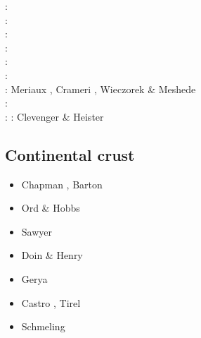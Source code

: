 \begin{scriptsize}
\twothousandtwelve: \cite{crsg12}\cite{chgv12}\cite{krwd12}\cite{may12}\cite{gerb12}\cite{asmo12}\\
\twothousandthirteen: \cite{chtl13}\cite{kemk13}\cite{gemd13}\cite{hutm13}\\
\twothousandfourteen: \cite{thmk14}\cite{mabl14}\cite{lopp14}\cite{stlh14}\\
\twothousandfifteen: \cite{lelk15}\cite{rumi15}\cite{chpe15}\cite{mabl15}\\
\twothousandsixteen: \cite{dumy16}\cite{blmp16}\\
\twothousandseventeen: \cite{robh17}\cite{wisv17}\cite{majc17}\\
\twothousandeighteen: Meriaux \etal \cite{memm18}, Crameri \cite{cram18}, Wieczorek \& Meshede \cite{wime18}\\
\twothousandnineteen: \cite{liki19}\cite{demh19}\cite{galb19}\cite{frtv19}\cite{yuwa19}\cite{ropu19}\\
\twothousandtwenty: \cite{homb20}\cite{trlb20}\cite{gadb20}\cite{jaca20a,jaca20b} 
\twothousandtwentyone: Clevenger \& Heister \cite{clhe21}
\end{scriptsize}



\subsection{Continental crust} 

\begin{scriptsize}
\begin{itemize}
\item[\nineteeneightysix] Chapman \cite{chap86}, Barton \cite{bart86}
\item[\nineteeneightynine] Ord \& Hobbs \cite{ord89}
\item[\nineteenninetyfour] Sawyer \cite{sawy94}
\item[\twothousandone] Doin \& Henry \cite{dohe01}
\item[\twothousandfour] Gerya \etal \cite{gepm04}
\item[\twothousandthirteen] Castro \etal \cite{cavg13}, Tirel \etal \cite{tibb13}
\item[\twothousandnineteen] Schmeling \etal \cite{scmw19}
\end{itemize}
\end{scriptsize}


